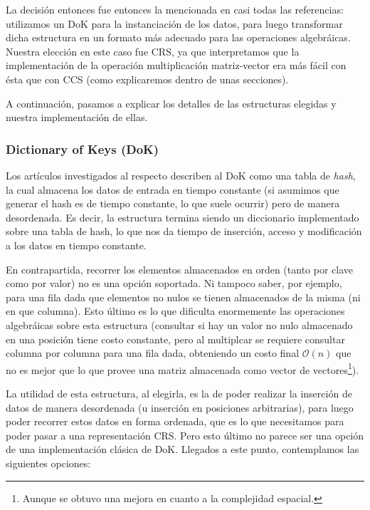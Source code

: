 \par La decisi\'on entonces fue entonces la mencionada en casi todas las
referencias: utilizamos un DoK para la instanciaci\'on de los datos, para luego
transformar dicha estructura en un formato m\'as adecuado para las operaciones
algebr\'aicas. Nuestra elecci\'on en este caso fue CRS, ya que interpretamos que
la implementaci\'on de la operaci\'on multiplicaci\'on matriz-vector era m\'as
f\'acil con \'esta que con CCS (como explicaremos dentro de unas secciones).

\par A continuaci\'on, pasamos a explicar los detalles de las estructuras
elegidas y nuestra implementaci\'on de ellas.

\subsubsection{Dictionary of Keys (DoK)}
\par Los art\'iculos investigados al respecto describen al DoK como una tabla de
\emph{hash}, la cual almacena los datos de entrada en tiempo constante (si
asumimos que generar el hash es de tiempo constante, lo que suele ocurrir) pero
de manera desordenada. Es decir, la estructura termina siendo un diccionario
implementado sobre una tabla de hash, lo que nos da tiempo de inserci\'on,
acceso y modificaci\'on a los datos en tiempo constante.

\par En contrapartida, recorrer los elementos almacenados en orden (tanto por
clave como por valor) no es una opci\'on soportada. Ni tampoco saber, por
ejemplo, para una fila dada que elementos no nulos se tienen almacenados de la
misma (ni en que columna). Esto \'ultimo es lo que dificulta enormemente las
operaciones algebr\'aicas sobre esta estructura (consultar si hay un valor no
nulo almacenado en una posici\'on tiene costo constante, pero al multiplcar se
requiere consultar columna por columna para una fila dada, obteniendo un costo
final $\mathcal{O}(n)$ que no es mejor que lo que provee una matriz almacenada
como vector de vectores\footnote{Aunque se obtuvo una mejora en cuanto a la
complejidad espacial.}).

\par La utilidad de esta estructura, al elegirla, es la de poder realizar la
inserci\'on de datos de manera desordenada (u inserci\'on en posiciones
arbitrarias), para luego poder recorrer estos datos en forma ordenada, que es lo
que necesitamos para poder pasar a una representaci\'on CRS. Pero esto \'ultimo
no parece ser una opci\'on de una implementaci\'on cl\'asica de DoK. Llegados a
este punto, contemplamos las siguientes opciones:

